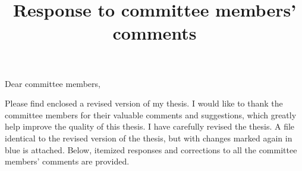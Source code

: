 \documentclass[aps,prl,reprint,showpacs,floatfix,superscriptaddress, onecolumn, 12pt]{revtex4-2}
\begin{document}

\title{Response to committee members' comments}
\author{}

\maketitle

\noindent Dear committee members,

Please find enclosed a revised version of my thesis. I would like to thank the committee members for their valuable comments and suggestions, which greatly help improve the quality of this thesis. I have carefully revised the thesis. A file identical to the revised version of the thesis, but with changes marked again in blue is attached. Below, itemized responses and corrections to all the committee members' comments are provided.
\end{document}

